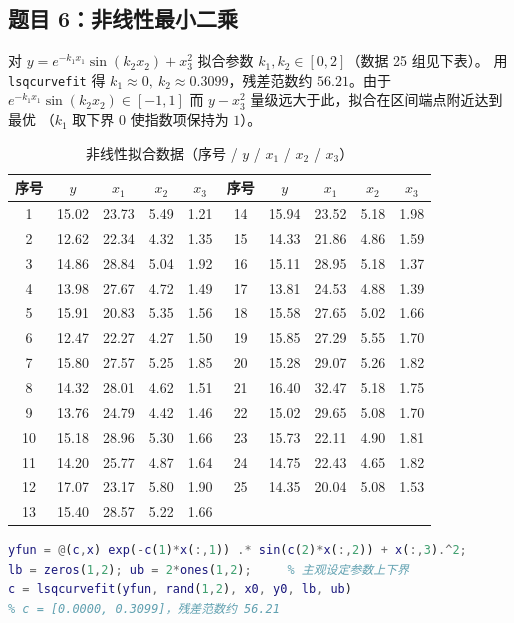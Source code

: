 \documentclass[zihao=5,a4paper]{ctexart}
\begin{document}
\subsection{题目 6：非线性最小二乘}
对 $y=e^{-k_1x_1}\sin(k_2x_2)+x_3^2$ 拟合参数 $k_1,k_2\in[0,2]$（数据 25 组见下表）。
用 \texttt{lsqcurvefit} 得 $k_1\approx0,\ k_2\approx0.3099$，残差范数约 $56.21$。由于
$e^{-k_1x_1}\sin(k_2x_2)\in[-1,1]$ 而 $y-x_3^2$ 量级远大于此，拟合在区间端点附近达到最优
（$k_1$ 取下界 $0$ 使指数项保持为 $1$）。

\begin{table}[H]
\centering\footnotesize
\caption{非线性拟合数据（序号 / $y$ / $x_1$ / $x_2$ / $x_3$）}
\begin{tabular}{ccccc|ccccc}
\toprule
序号 & $y$ & $x_1$ & $x_2$ & $x_3$ & 序号 & $y$ & $x_1$ & $x_2$ & $x_3$\\
\midrule
1 &15.02&23.73&5.49&1.21 & 14&15.94&23.52&5.18&1.98\\
2 &12.62&22.34&4.32&1.35 & 15&14.33&21.86&4.86&1.59\\
3 &14.86&28.84&5.04&1.92 & 16&15.11&28.95&5.18&1.37\\
4 &13.98&27.67&4.72&1.49 & 17&13.81&24.53&4.88&1.39\\
5 &15.91&20.83&5.35&1.56 & 18&15.58&27.65&5.02&1.66\\
6 &12.47&22.27&4.27&1.50 & 19&15.85&27.29&5.55&1.70\\
7 &15.80&27.57&5.25&1.85 & 20&15.28&29.07&5.26&1.82\\
8 &14.32&28.01&4.62&1.51 & 21&16.40&32.47&5.18&1.75\\
9 &13.76&24.79&4.42&1.46 & 22&15.02&29.65&5.08&1.70\\
10&15.18&28.96&5.30&1.66 & 23&15.73&22.11&4.90&1.81\\
11&14.20&25.77&4.87&1.64 & 24&14.75&22.43&4.65&1.82\\
12&17.07&23.17&5.80&1.90 & 25&14.35&20.04&5.08&1.53\\
13&15.40&28.57&5.22&1.66 & & & & &\\
\bottomrule
\end{tabular}
\end{table}

\begin{lstlisting}[language=Matlab]
yfun = @(c,x) exp(-c(1)*x(:,1)) .* sin(c(2)*x(:,2)) + x(:,3).^2;
lb = zeros(1,2); ub = 2*ones(1,2);     % 主观设定参数上下界
c = lsqcurvefit(yfun, rand(1,2), x0, y0, lb, ub)
% c = [0.0000, 0.3099]，残差范数约 56.21
\end{lstlisting}
\end{document}
